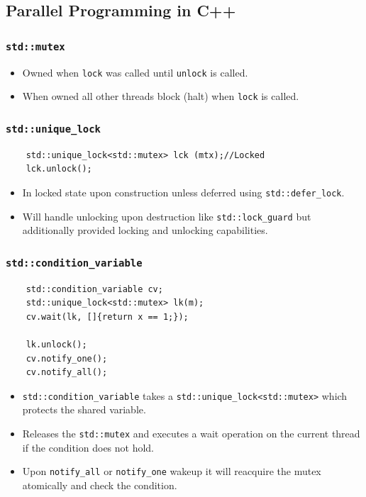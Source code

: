 \documentclass[10pt,landscape,a4paper, table]{extarticle}
\begin{document}
\begin{multicols*}{3}
\subsection{Parallel Programming in C++}

\subsubsection{\texttt{std::mutex}}
\begin{itemize}
    \item Owned when \texttt{lock} was called until \texttt{unlock} is called. 
    \item When owned all other threads block (halt) when \texttt{lock} is called. 
\end{itemize}

\subsubsection{\texttt{std::unique\_lock}}

\begin{verbatim}
    std::unique_lock<std::mutex> lck (mtx);//Locked
    lck.unlock();
\end{verbatim}

\begin{itemize}
    \item In locked state upon construction unless deferred using \texttt{std::defer\_lock}.
    \item Will handle unlocking upon destruction like \texttt{std::lock\_guard} but additionally provided locking and unlocking capabilities. 
\end{itemize}

\subsubsection{\texttt{std::condition\_variable}}

\begin{verbatim}
    std::condition_variable cv;
    std::unique_lock<std::mutex> lk(m);
    cv.wait(lk, []{return x == 1;});
    
    lk.unlock();
    cv.notify_one();
    cv.notify_all();
\end{verbatim}


\begin{itemize}
    \item \texttt{std::condition\_variable} takes a \texttt{std::unique\_lock<std::mutex>} which protects the shared variable.
    \item Releases the \texttt{std::mutex} and executes a wait operation on the current thread if the condition does not hold. 
    \item Upon \texttt{notify\_all} or \texttt{notify\_one} wakeup it will reacquire the mutex atomically and check the condition. 
\end{itemize}

\end{multicols*}
\end{document}
